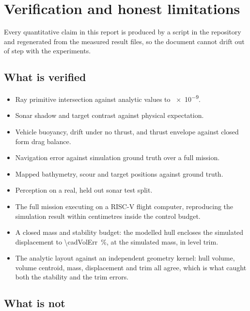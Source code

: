 \documentclass[10pt,a4paper]{article}
\begin{document}
\section{Verification and honest limitations}

Every quantitative claim in this report is produced by a script in the
repository and regenerated from the measured result files, so the document
cannot drift out of step with the experiments.

\subsection{What is verified}

\begin{itemize}[leftmargin=*,itemsep=2pt]
\item Ray primitive intersection against analytic values to \num{e-9}.
\item Sonar shadow and target contrast against physical expectation.
\item Vehicle buoyancy, drift under no thrust, and thrust envelope against
closed form drag balance.
\item Navigation error against simulation ground truth over a full mission.
\item Mapped bathymetry, scour and target positions against ground truth.
\item Perception on a real, held out sonar test split.
\item The full mission executing on a RISC-V flight computer, reproducing the
simulation result within centimetres inside the control budget.
\item A closed mass and stability budget: the modelled hull encloses the
simulated displacement to \SI{\cadVolErr}{\percent}, at the simulated mass, in
level trim.
\item The analytic layout against an independent geometry kernel: hull volume,
volume centroid, mass, displacement and trim all agree, which is what caught
both the stability and the trim errors.
\end{itemize}

\subsection{What is not}
\end{document}
